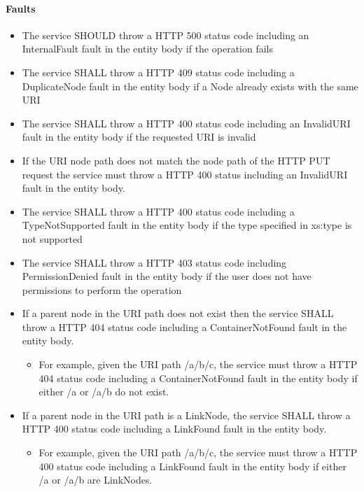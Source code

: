 \documentclass[11pt,a4paper]{ivoa}
\begin{document}
\paragraph{Faults}
\begin{itemize}
    \item The service SHOULD throw a HTTP 500 status code including an InternalFault fault in the entity body if the operation fails
    \item The service SHALL throw a HTTP 409 status code including a DuplicateNode fault in the entity body if a Node already exists with the same URI
    \item The service SHALL throw a HTTP 400 status code including an InvalidURI fault in the entity body if the requested URI is invalid
    \item If the URI node path does not match the node path of the HTTP PUT request the service must throw a HTTP 400 status including an InvalidURI fault in the entity body.
    \item The service SHALL throw a HTTP 400 status code including a TypeNotSupported fault in the entity body if the type specified in xs:type is not supported
    \item The service SHALL throw a HTTP 403 status code including PermissionDenied fault in the entity body if the user does not have permissions to perform the operation
    \item If a parent node in the URI path does not exist then the service SHALL throw a HTTP 404 status code including a ContainerNotFound fault in the entity body.
    \begin{itemize}
        \item For example, given the URI path /a/b/c, the service must throw a HTTP 404 status code including a ContainerNotFound fault in the entity body if either /a or /a/b do not exist.
    \end{itemize}
    \item If a parent node in the URI path is a LinkNode, the service SHALL throw a HTTP 400 status code including a LinkFound fault in the entity body.
        \begin{itemize}
        \item For example, given the URI path /a/b/c, the service must throw a HTTP 400 status code including a LinkFound fault in the entity body if either /a or /a/b are LinkNodes.
    \end{itemize}
\end{itemize}
\end{document}
